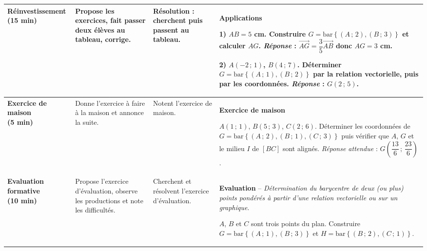 \documentclass[10pt,a4paper]{article}
\newcommand{\vc}[1]{\overrightarrow{#1}}                     %
\newcommand{\barG}[1]{\mathrm{bar}\left\{#1\right\}}          %
\begin{document}
{\begin{longtable}{|L{3.0cm}|L{4.5cm}|L{3.5cm}|L{5.5cm}|}
\textbf{\color{cApp}Réinvestissement\newline(15 min)}
& Propose les exercices, fait passer deux élèves au tableau, corrige.
& Résolution : cherchent puis passent au tableau.
& \textbf{\color{cApp}Applications}\par
\textbf{1)} $AB=5$ cm. Construire $G=\barG{(A\,;\,2),(B\,;\,3)}$ et calculer $AG$.\newline
\emph{Réponse} : $\vc{AG}=\dfrac{3}{5}\vc{AB}$ donc $AG=3$ cm.\par
\textbf{2)} $A(-2\,;\,1)$, $B(4\,;\,7)$. Déterminer $G=\barG{(A\,;\,1),(B\,;\,2)}$ par la relation vectorielle, puis par les coordonnées.\newline
\emph{Réponse} : $G(2\,;\,5)$.
\\\hline

\textbf{\color{cApp}Exercice de maison\newline(5 min)}
& Donne l'exercice à faire à la maison et annonce la suite.
& Notent l'exercice de maison.
& \textbf{\color{cApp}Exercice de maison}\par
$A(1\,;\,1)$, $B(5\,;\,3)$, $C(2\,;\,6)$. Déterminer les coordonnées de $G=\barG{(A\,;\,2),(B\,;\,1),(C\,;\,3)}$ puis vérifier que $A$, $G$ et le milieu $I$ de $[BC]$ sont alignés.\newline
\emph{Réponse attendue} : $G\left(\dfrac{13}{6}\,;\,\dfrac{23}{6}\right)$.
\\\hline

\textbf{\color{cDef}Evaluation formative\newline(10 min)}
& Propose l'exercice d'évaluation, observe les productions et note les difficultés.
& Cherchent et résolvent l'exercice d'évaluation.
& \textbf{\color{cDef}Evaluation} -- \emph{Détermination du barycentre de deux (ou plus) points pondérés à partir d'une relation vectorielle ou sur un graphique}.\par
$A$, $B$ et $C$ sont trois points du plan. Construire $G=\barG{(A\,;\,1),(B\,;\,3)}$ et $H=\barG{(B\,;\,2),(C\,;\,1)}$.
\\\hline
\end{longtable}}
\end{document}
